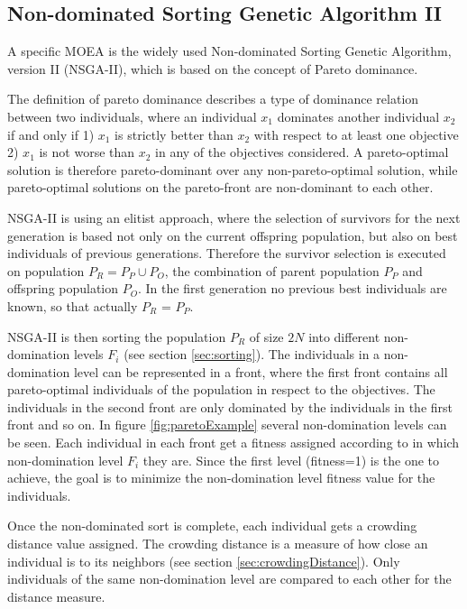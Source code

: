     \subsection{Non-dominated Sorting Genetic Algorithm II}
    \label{sec:nsga2}
    A specific MOEA is the widely used Non-dominated Sorting Genetic Algorithm, version II (NSGA-II)\cite{Deb:2002}, which is based on the concept of Pareto dominance.
    
    The definition of pareto dominance describes a type of dominance relation between two individuals, where an individual $x_1$ dominates another individual $x_2$ if and only if 1) $x_1$ is strictly better than $x_2$ with respect to at least one objective 2) $x_1$ is not worse than $x_2$ in any of the objectives considered\cite{clune2013evolutionary}. A pareto-optimal solution is therefore pareto-dominant over any non-pareto-optimal solution, while pareto-optimal solutions on the pareto-front are non-dominant to each other.
    
    NSGA-II is using an elitist approach, where the selection of survivors for the next generation is based not only on the current offspring population, but also on best individuals of previous generations. Therefore the survivor selection is executed on population $P_R = P_P \cup P_O$, the combination of parent population $P_P$ and offspring population $P_O$. In the first generation no previous best individuals are known, so that actually $P_R$ = $P_P$.
    
    NSGA-II is then sorting the population $P_R$ of size $2N$ into different non-domination levels $F_i$ (see section \ref{sec:sorting}). The individuals in a non-domination level can be represented in a front, where the first front contains all pareto-optimal individuals of the population in respect to the objectives. The individuals in the second front are only dominated by the individuals in the first front and so on. In figure \ref{fig:paretoExample} several non-domination levels can be seen. Each individual in each front get a fitness assigned according to in which non-domination level $F_i$ they are. Since the first level (fitness=1) is the one to achieve, the goal is to minimize the non-domination level fitness value for the individuals.
    
    Once the non-dominated sort is complete, each individual gets a crowding distance value assigned. The crowding distance is a measure of how close an individual is to its neighbors (see section \ref{sec:crowdingDistance}). Only individuals of the same non-domination level are compared to each other for the distance measure.
    
